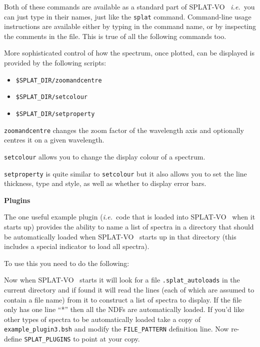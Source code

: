 \documentclass[twoside,11pt,nolof]{starlink}
\providecommand{\SPLAT}{\textsf{SPLAT-VO }}
\providecommand{\hitext}[1]{\texttt{#1}}
\providecommand{\ie}{\textit{i.e.}}
\providecommand{\subheading}[1]{\textbf{\large{#1}}}
\begin{document}
Both of these commands are available as a standard part of \SPLAT\
\ie\ you can just type in their names, just like the \hitext{splat}
command. Command-line usage instructions
are available either by typing in the command name, or by inspecting
the comments in the file. This is true of all the following commands too.

More sophisticated control of how the spectrum, once plotted, can be
displayed is provided by the following scripts:
\begin{itemize}
 \item \hitext{\$SPLAT\_DIR/zoomandcentre}
 \item \hitext{\$SPLAT\_DIR/setcolour}
 \item \hitext{\$SPLAT\_DIR/setproperty}
\end{itemize}
\hitext{zoomandcentre} changes the zoom factor of the wavelength axis
and optionally centres it on a given wavelength.

\hitext{setcolour} allows you to change the display colour of a spectrum.

\hitext{setproperty} is quite similar to \hitext{setcolour} but it
also allows you to set the line thickness, type and style, as well as
whether to display error bars.

\subheading{Plugins}

The one useful example plugin (\ie\ code that is loaded into \SPLAT\
when it starts up) provides the ability to name a list of spectra in a
directory that should be automatically loaded when \SPLAT\ starts up
in that directory (this includes a special indicator to load all
spectra).

To use this you need to do the following:
\begin{quote}
\begin{terminalv}
\end{terminalv}
\end{quote}
Now when \SPLAT\ starts it will look for a file
\hitext{.splat\_autoloads}  in the current directory and if found
it will read the lines (each of which are
assumed to contain a file name) from it to construct a list of spectra
to display. If the file only has one line ``*'' then all the NDFs are
automatically loaded. If you'd like other types of spectra to be
automatically loaded take a copy of \hitext{example\_plugin3.bsh} and
modify the \hitext{FILE\_PATTERN} definition line. Now re-define
\hitext{SPLAT\_PLUGINS} to point at your copy.
\end{document}
